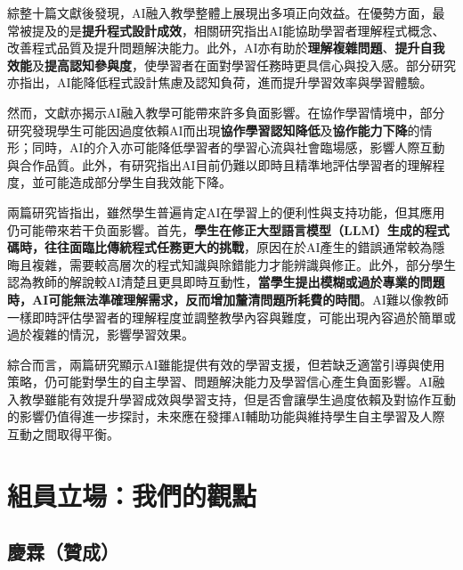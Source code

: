 綜整十篇文獻後發現，AI融入教學整體上展現出多項正向效益。在優勢方面，最常被提及的是\textbf{提升程式設計成效}，相關研究指出AI能協助學習者理解程式概念、改善程式品質及提升問題解決能力\cite{fan2025pair,groothuijsen2024chatbots,llerena2024introductory,omeh2025pbl,kohen2025integrating,tang2025enhancing}。此外，AI亦有助於\textbf{理解複雜問題}\cite{cao2023chatbots,groothuijsen2024chatbots,llerena2024introductory,tang2025enhancing}、\textbf{提升自我效能}\cite{yan2025llm,tang2025enhancing,cubillos2025generative}及\textbf{提高認知參與度}\cite{cao2023chatbots,kohen2025integrating}，使學習者在面對學習任務時更具信心與投入感。部分研究亦指出，AI能降低程式設計焦慮\cite{fan2025pair}及認知負荷\cite{yan2025llm}，進而提升學習效率與學習體驗。

然而，文獻亦揭示AI融入教學可能帶來許多負面影響。在協作學習情境中，部分研究發現學生可能因過度依賴AI而出現\textbf{協作學習認知降低}\cite{fan2025pair,groothuijsen2024chatbots}及\textbf{協作能力下降}\cite{groothuijsen2024chatbots}的情形；同時，AI的介入亦可能降低學習者的學習心流\cite{yang2025chatgpt}與社會臨場感\cite{fan2025pair}，影響人際互動與合作品質。此外，有研究指出AI目前仍難以即時且精準地評估學習者的理解程度\cite{yang2025chatgpt}，並可能造成部分學生自我效能下降\cite{yang2025chatgpt}。

\cite{kohen2025integrating,yang2025chatgpt}兩篇研究皆指出，雖然學生普遍肯定AI在學習上的便利性與支持功能，但其應用仍可能帶來若干负面影響。首先，\textbf{學生在修正大型語言模型（LLM）生成的程式碼時，往往面臨比傳統程式任務更大的挑戰}，原因在於AI產生的錯誤通常較為隱晦且複雜，需要較高層次的程式知識與除錯能力才能辨識與修正。此外，部分學生認為教師的解說較AI清楚且更具即時互動性，\textbf{當學生提出模糊或過於專業的問題時，AI可能無法準確理解需求，反而增加釐清問題所耗費的時間}。AI難以像教師一樣即時評估學習者的理解程度並調整教學內容與難度，可能出現內容過於簡單或過於複雜的情況，影響學習效果\cite{yang2025chatgpt}。

綜合而言，兩篇研究顯示AI雖能提供有效的學習支援，但若缺乏適當引導與使用策略，仍可能對學生的自主學習、問題解決能力及學習信心產生負面影響\cite{kohen2025integrating,yang2025chatgpt}。AI融入教學雖能有效提升學習成效與學習支持，但是否會讓學生過度依賴及對協作互動的影響仍值得進一步探討，未來應在發揮AI輔助功能與維持學生自主學習及人際互動之間取得平衡。

\section{組員立場：我們的觀點}\label{sec:組員立場}

\subsection{慶霖（贊成）}\label{sec:慶霖}

